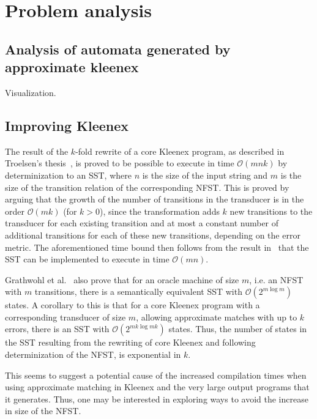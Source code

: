 \section{Problem analysis}

\subsection{Analysis of automata generated by approximate kleenex}

Visualization.

\subsection{Improving Kleenex}

The result of the $k$-fold rewrite of a core Kleenex program, as described in
Troelsen's thesis~\cite{troelsen2016approximate}, is proved to be possible to
execute in time $\mathcal{O}(mnk)$ by determinization to an SST, where $n$ is
the size of the input string and $m$ is the size of the transition relation of
the corresponding NFST. This is proved by arguing that the growth of the number
of transitions in the transducer is in the order $\mathcal{O}(mk)$ (for $k>0$),
since the transformation adds $k$ new transitions to the transducer for each
existing transition and at most a constant number of additional transitions for
each of these new transitions, depending on the error metric. The
aforementioned time bound then follows from the result
in~\cite{grathwohl2016kleenex} that the SST can be implemented to execute in
time $\mathcal{O}(mn)$.


Grathwohl et al.~\cite{grathwohl2016kleenex} also prove that for an oracle
machine of size $m$, i.e. an NFST with $m$ transitions, there is a semantically
equivalent SST with $\mathcal{O}(2^{m \log m})$ states. A corollary to this is
that for a core Kleenex program with a corresponding transducer of size $m$,
allowing approximate matches with up to $k$ errors, there is an SST with
$\mathcal{O}(2^{mk \log mk})$ states. Thus, the number of states in the SST
resulting from the rewriting of core Kleenex and following determinization of
the NFST, is exponential in $k$.

This seems to suggest a potential cause of the increased compilation times when
using approximate matching in Kleenex and the very large output programs that
it generates. Thus, one may be interested in exploring ways to avoid the
increase in size of the NFST.

